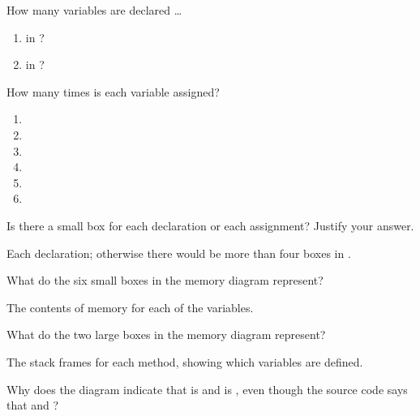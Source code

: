 \documentclass[12pt]{article}
\begin{document}


\Q How many variables are declared \ldots

\begin{multicols}{2}
\begin{enumerate}
\item in ? 
\item in ? 
\end{enumerate}
\end{multicols}


\Q How many times is each variable assigned?

\begin{multicols}{2}
\begin{enumerate}
\item {}  
\item {} 
\item {} 
\item {}  
\item {}    
\item {}   
\end{enumerate}
\end{multicols}


\Q Is there a small box for each declaration or each assignment? Justify your answer.

\begin{answer}[3em]
Each declaration; otherwise there would be more than four boxes in .
\end{answer}


\Q What do the six small boxes in the memory diagram represent?

\begin{answer}[3em]
The contents of memory for each of the variables.
\end{answer}


\Q What do the two large boxes in the memory diagram represent?

\begin{answer}[3em]
The stack frames for each method, showing which variables are defined.
\end{answer}


\Q \label{key1}
Why does the diagram indicate that  is  and  is , even though the source code says that  and ?
\end{document}
